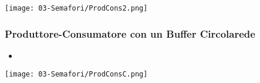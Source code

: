 \begin{center}
   \texttt{[image: 03-Semafori/ProdCons2.png]}
\end{center}

\subsubsection{Produttore-Consumatore con un Buffer Circolarede}

\begin{itemize}
  \item
\end{itemize}

\begin{center}
   \texttt{[image: 03-Semafori/ProdConsC.png]}
\end{center}






